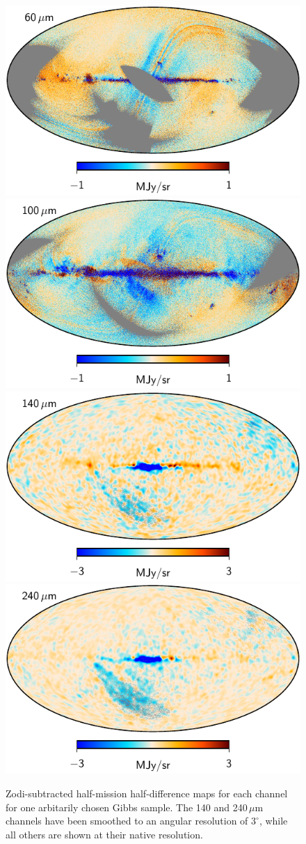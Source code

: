 \documentclass{aa}
\begin{document}
\begin{figure}
       	\includegraphics[width=0.35\linewidth]{figs/dirbe_07_hmhd_v4.pdf}
       	\includegraphics[width=0.35\linewidth]{figs/dirbe_08_hmhd_v4.pdf}\\       
       	\includegraphics[width=0.35\linewidth]{figs/dirbe_09_hmhd_3deg_v4.pdf}
       	\includegraphics[width=0.35\linewidth]{figs/dirbe_10_hmhd_3deg_v4.pdf}       
       	\caption{Zodi-subtracted half-mission half-difference maps for each channel for one arbitarily chosen Gibbs sample. The 140 and 240\,$\mu$m channels have been smoothed to an angular resolution of $3^{\circ}$, while all others are shown at their native resolution. }
       	\label{fig:hmhd}
       \end{figure}
       
\end{document}
